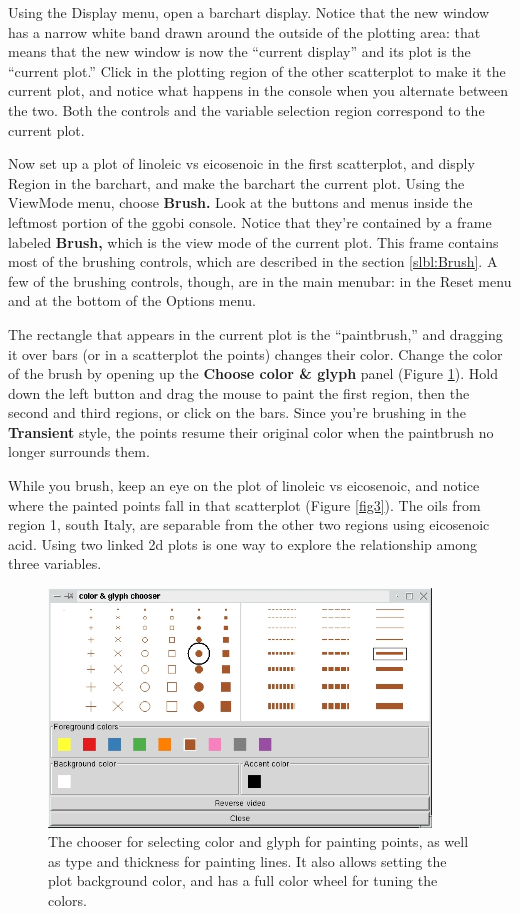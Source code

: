 \documentclass[11pt]{article}
\begin{document}
Using the Display menu, open a barchart display. Notice that the new
window has a narrow white band drawn around the outside of the plotting
area:  that means that the new window is now the ``current display''
and its plot is the ``current plot.''  Click in the plotting region
of the other scatterplot to make it the current plot, and notice what
happens in the console when you alternate between the two.  Both the
controls and the variable selection region correspond to the current plot.

Now set up a plot of linoleic vs eicosenoic in the first scatterplot,
and disply Region in the barchart, and make the barchart the current
plot.  Using the ViewMode menu, choose {\bf Brush.}  Look at the
buttons and menus inside the leftmost portion of the ggobi console.
Notice that they're contained by a frame labeled {\bf Brush,} which is
the view mode of the current plot.  This frame contains most of the
brushing controls, which are described in the section
\ref{slbl:Brush}.  A few of the brushing controls, though, are in the
main menubar: in the Reset menu and at the bottom of the Options menu.

The rectangle that appears in the current plot is the ``paintbrush,''
and dragging it over bars (or in a scatterplot the points) changes
their color. Change the color of the brush by opening up the {\bf
Choose color \& glyph} panel (Figure \ref{fig2}). Hold down the left
button and drag the mouse to paint the first region, then the second
and third regions, or click on the bars.  Since you're brushing in the
{\bf Transient} style, the points resume their original color when the
paintbrush no longer surrounds them.

While you brush, keep an eye on the plot of linoleic vs eicosenoic,
and notice where the painted points fall in that scatterplot (Figure
\ref{fig3}).  The oils from region 1, south Italy, are separable from
the other two regions using eicosenoic acid. Using two linked 2d plots
is one way to explore the relationship among three variables.

\begin{figure}[htp]
\begin{center}
\includegraphics[width=4in]{Figures/olive-colorchoose.jpg}
\end{center}
\caption{The chooser for selecting color and glyph for painting points,
as well as type and thickness for painting lines. It also allows setting
the plot background color, and has a full color wheel for tuning the
colors.
}
\label{fig2}
\end{figure}
\end{document}
